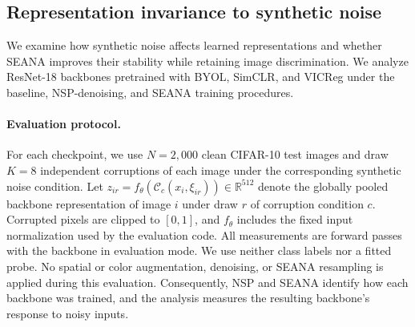 
\subsection{Representation invariance to synthetic noise}
\label{sec:representation_invariance}

We examine how synthetic noise affects learned representations and whether
SEANA improves their stability while retaining image discrimination. We analyze
ResNet-18 backbones pretrained with BYOL, SimCLR, and VICReg under the baseline,
NSP-denoising, and SEANA training procedures.

\paragraph{Evaluation protocol.}
For each checkpoint, we use $N=2{,}000$ clean CIFAR-10 test images and draw
$K=8$ independent corruptions of each image under the corresponding synthetic
noise condition. Let
$z_{ir}=f_\theta(\mathcal{C}_c(x_i,\xi_{ir}))\in\mathbb{R}^{512}$
denote the globally pooled backbone representation of image $i$ under draw $r$
of corruption condition $c$. Corrupted pixels are clipped to $[0,1]$, and
$f_\theta$ includes the fixed input normalization used by the evaluation code.
All measurements are forward passes with the backbone in evaluation mode.
We use neither class labels nor a fitted probe. No spatial or color augmentation,
denoising, or SEANA resampling is applied during this evaluation. Consequently,
NSP and SEANA identify how each backbone was trained, and the analysis measures
the resulting backbone's response to noisy inputs.

